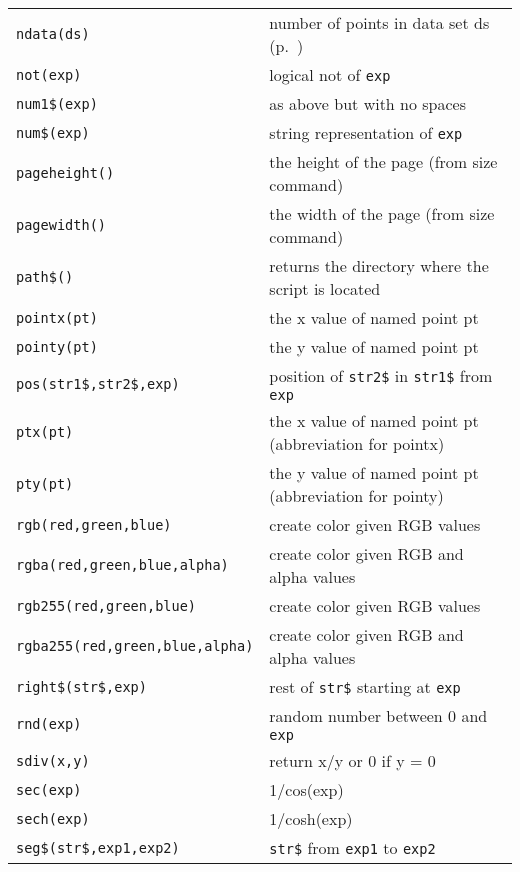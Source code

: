 \begin{supertabular}{ll}
{\tt ndata(ds)}            & number of points in data set ds (p.~\pageref{ndata})\\
{\tt not(exp)}          	& logical not of {\tt exp} \\
{\tt num1\$(exp)}    	& as above but with no spaces \\
{\tt num\$(exp)}      	& string representation of {\tt exp} \\
{\tt pageheight()}  & the height of the page (from size command) \\
{\tt pagewidth()} 	& the width of the page (from size command) \\
{\tt path\$()}          & returns the directory where the script is located \\
{\tt pointx(pt)}     	& the x value of named point pt \\
{\tt pointy(pt)}     	& the y value of named point pt \\
{\tt pos(str1\$,str2\$,exp)}      & position of {\tt str2\$} in {\tt str1\$} from {\tt exp} \\
{\tt ptx(pt)}           	& the x value of named point pt (abbreviation for pointx) \\
{\tt pty(pt)}          	& the y value of named point pt (abbreviation for pointy)\\
{\tt rgb(red,green,blue)}   & create color given RGB values \\
{\tt rgba(red,green,blue,alpha)}   & create color given RGB and alpha values \\
{\tt rgb255(red,green,blue)}   & create color given RGB values \\
{\tt rgba255(red,green,blue,alpha)}   & create color given RGB and alpha values \\
{\tt right\$(str\$,exp)}      & rest of {\tt str\$} starting at {\tt exp} \\
{\tt rnd(exp)}          	& random number between 0 and {\tt exp} \\
{\tt sdiv(x,y)} 	     	& return x/y or 0 if y = 0 \\
{\tt sec(exp)} 	     	& 1/cos(exp) \\
{\tt sech(exp)}        	& 1/cosh(exp) \\
{\tt seg\$(str\$,exp1,exp2)}    & {\tt str\$} from {\tt exp1} to {\tt exp2} \\

\end{supertabular}
